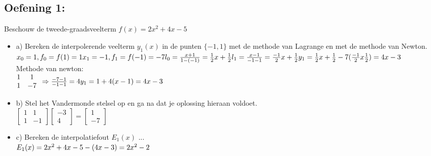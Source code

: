 \documentclass[../Oefenzitting4.tex]{subfiles}
\begin{document}
  \subsection{Oefening 1:}
    Beschouw de tweede-graadsveelterm $f(x) = 2x^{2} + 4x -5$
    \begin{itemize}
      \item a) Bereken de interpolerende veelterm $y_{1}(x)$ in de punten $\{-1, 1 \} $ met de methode van Lagrange en met de methode van Newton.
      \\
      $
        x_{0} = 1, f_{0} = f(1) = 1
        \\
        x_{1} = -1, f_{1} = f(-1) = -7
        \\
        l_{0} = \frac{x+1}{1-(-1)} = \frac{1}{2}x + \frac{1}{2}
        \\
        l_{1} = \frac{x-1}{-1-1} = \frac{-1}{2}x + \frac{1}{2}
        \\
        y_{1} = \frac{1}{2}x + \frac{1}{2} - 7(\frac{-1}{2}x \frac{1}{2})
        \\
        = 4x -3
      $
      \\
      Methode van newton:
      \\
      $
        \begin{matrix}
          1 & 1  \\
          1 & -7
        \end{matrix}
        \\
        \Rightarrow \frac{-7 - 1}{-1 - 1} = 4
        \\
        y_{1} = 1+4(x-1) = 4x - 3
      $

      \item b) Stel het Vandermonde stelsel op en ga na dat je oplossing hieraan voldoet.
      \\
      $
      \begin{bmatrix}
        1 & 1  \\
        1 & -1
      \end{bmatrix}
      \begin{bmatrix}
        -3 \\
        4
      \end{bmatrix}
      =
      \begin{bmatrix}
        1 \\
        -7
      \end{bmatrix}
      $

      \item c) Bereken de interpolatiefout $E_{1}(x)$ ...
      \\
      $
          E_{1}(x) = 2x^{2} + 4x -5 - (4x -3)
          \\
          = 2x^{2} - 2
      $
    \end{itemize}
\end{document}
